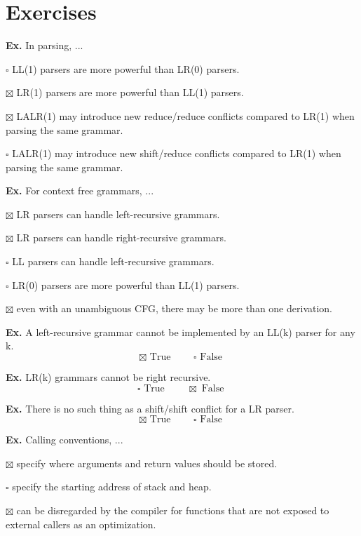 \section*{Exercises}

\hrulefill

\textbf{Ex.} In parsing, ...
\begin{compactitem}
	\item[$\square$] LL(1) parsers are more powerful than LR(0) parsers.
	\item[$\boxtimes$] LR(1) parsers are more powerful than LL(1) parsers.
	\item[$\boxtimes$] LALR(1) may introduce new reduce/reduce conflicts compared to LR(1) when parsing the same grammar.
	\item[$\square$] LALR(1) may introduce new shift/reduce conflicts compared to LR(1) when parsing the same grammar.
\end{compactitem}

\hrulefill

\textbf{Ex.} For context free grammars, ...
\begin{compactitem}
	\item[$\boxtimes$] LR parsers can handle left-recursive grammars.
	\item[$\boxtimes$] LR parsers can handle right-recursive grammars.
	\item[$\square$] LL parsers can handle left-recursive grammars.
	\item[$\square$] LR(0) parsers are more powerful than LL(1) parsers.
	\item[$\boxtimes$] even with an unambiguous CFG, there may be more than one derivation.
\end{compactitem}

\hrulefill

\textbf{Ex.} A left-recursive grammar cannot be implemented by an LL(k) parser for any k.
$$ \boxtimes \text{ True } \qquad \square \text{ False }$$

\hrulefill

\textbf{Ex.} LR(k) grammars cannot be right recursive.
$$ \square \text{ True } \qquad \boxtimes \text{ False }$$


\hrulefill

\textbf{Ex.} There is no such thing as a shift/shift conflict for a LR parser.
$$ \boxtimes \text{ True } \qquad \square \text{ False }$$


\hrulefill

\textbf{Ex.} Calling conventions, ...
\begin{compactitem}
	\item[$\boxtimes$] specify where arguments and return values should be stored.
	\item[$\square$] specify the starting address of stack and heap.
	\item[$\boxtimes$] can be disregarded by the compiler for functions that are not exposed to external callers as an optimization.
\end{compactitem}

